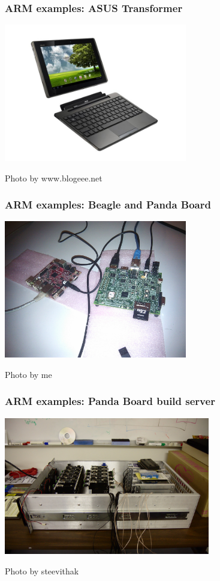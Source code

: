 \documentclass{beamer}
\begin{document}
\begin{frame}[t]
\frametitle{ARM examples: ASUS Transformer}
\begin{center}
\includegraphics[height=6cm]{Transformer.jpg}

{\scriptsize Photo by www.blogeee.net}
\end{center}
\end{frame}

\begin{frame}[t]
\frametitle{ARM examples: Beagle and Panda Board}
\begin{center}
\includegraphics[height=6cm]{beaglepanda.jpg}

{\scriptsize Photo by me}
\end{center}
\end{frame}

\begin{frame}[t]
\frametitle{ARM examples: Panda Board build server}
\begin{center}
\includegraphics[height=6cm]{server.jpg}

{\scriptsize Photo by steevithak}
\end{center}
\end{frame}
\end{document}
